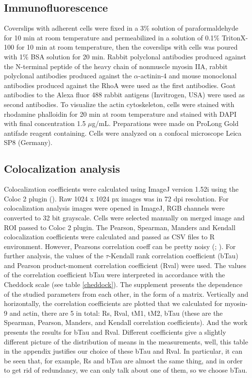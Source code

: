 \documentclass[alpha-refs]{wiley-article}
\begin{document}
\subsection{Immunofluorescence}

Coverslips with adherent cells were fixed in a 3\% solution of paraformaldehyde for 10 min at room temperature and permeabilized in a solution of 0.1\% TritonX-100 for 10 min at room temperature, then the coverslips with cells was poured with 1\% BSA solution for 20 min.
Rabbit polyclonal antibodies produced against the N-terminal peptide of the heavy chain of nonmuscle myosin IIA, rabbit polyclonal antibodies produced against the $\alpha$-actinin-4 and mouse monoclonal antibodies produced against the RhoA were used as the first antibodies.
Goat antibodies to the Alexa fluor 488 rabbit antigens (Invitrogen, USA) were used as second antibodies.
To visualize the actin cytoskeleton, cells were stained with rhodamine phalloidin for 20 min at room temperature and stained with DAPI with final concentration 1.5 $\mu$g/mL.
Preparations were made on ProLong Gold antifade reagent containing.
Cells were analyzed on a confocal microscope Leica SP8 (Germany).


\subsection{Colocalization analysis}

Colocalization coefficients were calculated using ImageJ version 1.52i using the Coloc 2 plugin (\cite{rueden2017imagej2}).
Raw 1024 x 1024 px images was in 72 dpi resolution.
For colocalization analysis images were opened in ImageJ, RGB channels were converted to 32 bit grayscale.
Cells were selected manually on merged image and ROI passed to Coloc 2 plugin.
The Pearson, Spearman, Manders and Kendall colocalization coefficients were calculated and passed as CSV files to R environment.
However, Pearsons correlation coeff can be pretty noisy (\cite{adler2008replicate}; \cite{bergholm2010analysis}).
For further analysis, the values of the $\tau$-Kendall rank correlation coefficient (bTau) and Pearson product-moment correlation coefficient (Rval) were used.
The values of the correlation coefficient bTau were interpreted in accordance with the Cheddock scale (see table \ref{cheddock}).
The supplement presents the dependence of the studied parameters from each other, in the form of a matrix.
Vertically and horizontally, the correlation coefficients are plotted that we calculated for myosin-9 and actin, there are 5 in total: Rs, Rval, tM1, tM2, bTau (these are the Spearman, Pearson, Manders, and Kendall correlation coefficients).
And the work presents the results for bTau and Rval.
Different coefficients give a slightly different picture of the distribution of means in the measurements, well, this table in the appendix justifies our choice of these bTau and Rval.
In particular, it can be seen that, for example, Rs and bTau are almost the same thing, and in order to get rid of redundancy, we can only talk about one of them, so we choose bTau.
\end{document}
